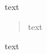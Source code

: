 \documentclass{beamer}
\begin{document}
\begin{frame}
    text

    \begin{quote}
        text
    \end{quote}

    text
\end{frame}
\end{document}
